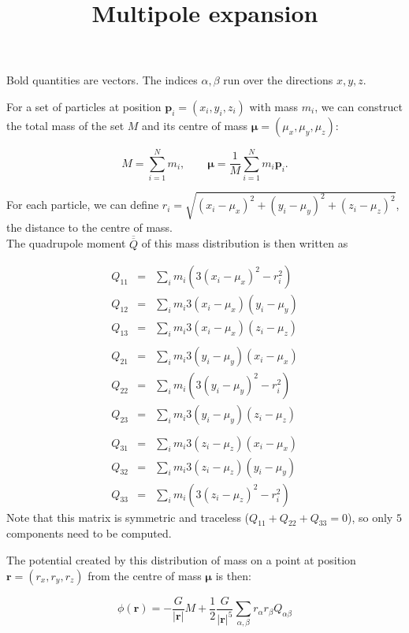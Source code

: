 \documentclass[a4paper,10pt]{article}
\title{Multipole expansion}
\newcommand{\rr}{\mathbf{r}}
\newcommand{\p}[1]{\mathbf{p}_#1}
\newcommand{\muu}{\boldsymbol{\mu}}
\begin{document}
\maketitle

Bold quantities are vectors. The indices $\alpha,\beta$ run over the directions $x,y,z$.

For a set of particles at position $\p{i}=(x_i, y_i, z_i)$ with mass $m_i$, we can construct the total mass of the set 
$M$ and its centre of mass $\muu=(\mu_x, \mu_y, \mu_z)$:

\begin{equation}
 M = \sum_{i=1}^N m_i, \qquad \muu = \frac{1}{M} \sum_{i=1}^N m_i\p{i}.
\end{equation}

For each particle, we can define $r_i= \sqrt{(x_i-\mu_x)^2 + (y_i-\mu_y)^2 + (z_i-\mu_z)^2}$, the distance to the 
centre of mass.\\
The quadrupole moment $\overline{\overline{Q}}$ of this mass distribution is then written as

\begin{eqnarray}
 Q_{11} &=& \sum_i m_i \left( 3(x_i-\mu_x)^2 - r_i^2\right) \\
 Q_{12} &=& \sum_i m_i 3(x_i-\mu_x)(y_i-\mu_y) \\
 Q_{13} &=& \sum_i m_i 3(x_i-\mu_x)(z_i-\mu_z) \\
 ~& & \nonumber\\
 Q_{21} &=& \sum_i m_i 3(y_i-\mu_y)(x_i-\mu_x) \\
 Q_{22} &=& \sum_i m_i \left( 3(y_i-\mu_y)^2 - r_i^2\right) \\
 Q_{23} &=& \sum_i m_i 3(y_i-\mu_y)(z_i-\mu_z) \\
 ~& &\nonumber\\
 Q_{31} &=& \sum_i m_i 3(z_i-\mu_z)(x_i-\mu_x)  \\
 Q_{32} &=& \sum_i m_i 3(z_i-\mu_z)(y_i-\mu_y) \\
 Q_{33} &=& \sum_i m_i \left( 3(z_i-\mu_z)^2 - r_i^2\right)
\end{eqnarray}
Note that this matrix is symmetric and traceless ($Q_{11}+Q_{22}+Q_{33}=0$), so only $5$ components need to be 
computed. \\

\pagebreak

The potential created by this distribution of mass on a point at position $\rr=(r_x,r_y,r_z)$ from the centre of mass 
$\muu$ is then:

\begin{equation}
 \phi(\rr) = -\frac{G}{|\rr|}M + \frac{1}{2}\frac{G}{|\rr|^5}\sum_{\alpha,\beta} r_\alpha r_\beta Q_{\alpha\beta}
\end{equation}
\end{document}
